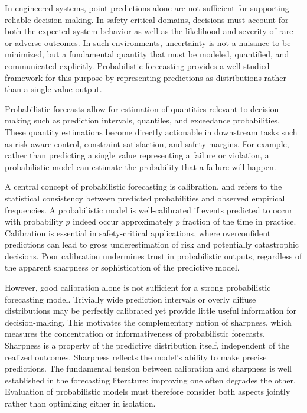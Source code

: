 In engineered systems, point predictions alone are not sufficient for supporting reliable decision-making. In safety-critical domains, decisions must account for both the expected system behavior as well as the likelihood and severity of rare or adverse outcomes. In such environments, uncertainty is not a nuisance to be minimized, but a fundamental quantity that must be modeled, quantified, and communicated explicitly. Probabilistic forecasting provides a well-studied framework for this purpose by representing predictions as distributions rather than a single value output.

Probabilistic forecasts allow for estimation of quantities relevant to decision making such as prediction intervals, quantiles, and exceedance probabilities. These quantity estimations become directly actionable in downstream tasks such as risk-aware control, constraint satisfaction, and safety margins. For example, rather than predicting a single value representing a failure or violation, a probabilistic model can estimate the probability that a failure will happen.

A central concept of probabilistic forecasting is calibration, and refers to the statistical consistency between predicted probabilities and observed empirical frequencies. A probabilistic model is well-calibrated if events predicted to occur with probability $p$ indeed occur approximately $p$ fraction of the time in practice. Calibration is essential in safety-critical applications, where overconfident predictions can lead to gross underestimation of risk and potentially catastrophic decisions. Poor calibration undermines trust in probabilistic outputs, regardless of the apparent sharpness or sophistication of the predictive model.

However, good calibration alone is not sufficient for a strong probabilistic forecasting model. Trivially wide prediction intervals or overly diffuse distributions may be perfectly calibrated yet provide little useful information for decision-making. This motivates the complementary notion of sharpness, which measures the concentration or informativeness of probabilistic forecasts. Sharpness is a property of the predictive distribution itself, independent of the realized outcomes. Sharpness reflects the model’s ability to make precise predictions. The fundamental tension between calibration and sharpness is well established in the forecasting literature: improving one often degrades the other. Evaluation of probabilistic models must therefore consider both aspects jointly rather than optimizing either in isolation.

